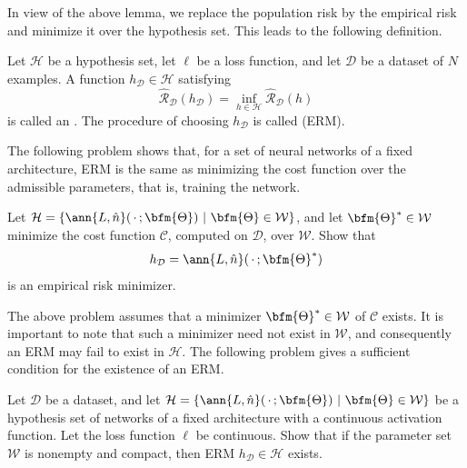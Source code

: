 In view of the above lemma, we replace the population risk by the empirical risk and minimize it over the hypothesis set. This leads to the following definition.
\begin{definition}\label{empirical.risk.minimizer.def}

Let $\mathcal{H}$ be a hypothesis set, let $\ell$ be a loss function, and let $\mathcal{D}$ be a dataset of $N$ examples.  A function $h_{\mathcal{D}}\in\mathcal{H}$ satisfying
$$
\widehat{\mathcal{R}}_{\mathcal{D}}(h_{\mathcal{D}}) = \inf_{h\in\mathcal{H}} \widehat{\mathcal{R}}_{\mathcal{D}}(h)
$$
is called an .  The procedure of choosing $h_{\mathcal{D}}$ is called  (ERM).
\end{definition}
The following problem shows that, for a set of neural networks of a fixed architecture, ERM is the same as minimizing the cost function over the admissible parameters, that is, training the network.
\begin{problem}
Let $\mathcal{H} = \{\ann{L,\hat{n}}(\,\cdot\,;\bfm{\Theta})~|~\bfm{\Theta}\in\mathcal{W}\}$, and let $\bfm{\Theta}^*\in\mathcal{W}$ minimize the cost function $\mathcal{C}$, computed on $\mathcal{D}$, over $\mathcal{W}$. Show that
$$h_{\mathcal{D}} = \ann{L,\hat{n}}(\,\cdot\,;\bfm{\Theta}^*)$$
is an empirical risk minimizer.
\end{problem}

The above problem assumes that a minimizer $\bfm{\Theta}^*\in \mathcal{W}$ of $\mathcal{C}$ exists.  It is important to note that such a minimizer need not exist in $\mathcal{W}$, and consequently an ERM may fail to exist in $\mathcal{H}$.  The following problem gives a sufficient condition for the existence of an ERM.
\begin{problem}
Let $\mathcal{D}$ be a dataset, and let $\mathcal{H} = \{\ann{L,\hat{n}}(\,\cdot\,;\bfm{\Theta})~|~\bfm{\Theta}\in\mathcal{W}\}$ be a hypothesis set of networks of a fixed architecture with a continuous activation function.  Let the loss function $\ell$ be continuous. Show that if the parameter set $\mathcal{W}$ is nonempty and compact, then ERM $h_{\mathcal{D}}\in \mathcal{H}$ exists.
\end{problem}

